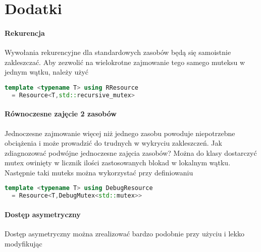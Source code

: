 \section{Dodatki}\label{sec:extras}

\paragraph{Rekurencja}
Wywołania rekurencyjne dla standardowych zasobów będą się samoistnie zakleszczać. Aby zezwolić na wielokrotne zajmowanie tego samego muteksu w jednym wątku, należy użyć 
\begin{lstlisting}[language=C++,style=cpp-style,aboveskip=2mm]
  template <typename T> using RResource
  = Resource<T,std::recursive_mutex>
\end{lstlisting}

\paragraph{Równoczesne zajęcie 2 zasobów}
Jednoczesne zajmowanie więcej niż jednego zasobu powoduje niepotrzebne obciążenia i może prowadzić do trudnych w wykryciu zakleszczeń. Jak zdiagnozować podwójne jednoczesne zajęcia zasobów? Można do klasy  dostarczyć mutex owinięty w licznik ilości zastosowanych blokad w lokalnym wątku.
Następnie taki muteks można wykorzystać przy definiowaniu
\begin{lstlisting}[language=C++,style=cpp-style,aboveskip=2mm]
  template <typename T> using DebugResource
  = Resource<T,DebugMutex<std::mutex>>
\end{lstlisting}

\paragraph{Dostęp asymetryczny}
Dostęp asymetryczny można zrealizować bardzo podobnie przy użyciu  i lekko modyfikując 
